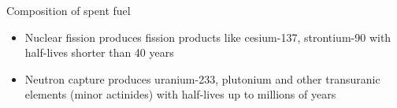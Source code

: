 \documentclass[10pt]{beamer}
\begin{document}
\begin{frame}{Composition of spent fuel}
\begin{itemize}
\item Nuclear fission produces fission products like cesium-137, strontium-90 with half-lives shorter than
40 years
\item Neutron capture produces uranium-233, plutonium and other transuranic elements (minor actinides) with half-lives up to
millions of years
\end{itemize}
\begin{figure}
\centering
{}
\end{figure}
\end{frame}
\end{document}
